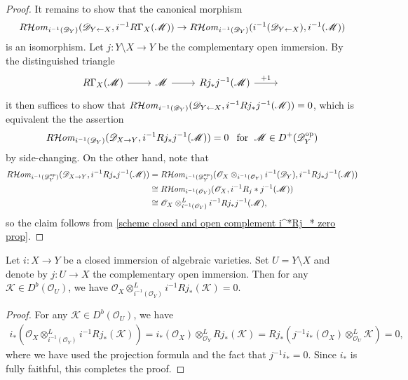\begin{proof}
It remains to show that the canonical morphism
\[R\!\operatorname{\mathcal{H}\hspace*{-0.4pt}\textit{om}\hspace{0.5pt}}_{i^{-1}(\mathscr{D}_Y)}(\mathscr{D}_{Y\leftarrow X},i^{-1}R\Gamma_X(\mathscr{M}))\to R\!\operatorname{\mathcal{H}\hspace*{-0.4pt}\textit{om}\hspace{0.5pt}}_{i^{-1}(\mathscr{D}_Y)}(i^{-1}(\mathscr{D}_{Y\leftarrow X}),i^{-1}(\mathscr{M}))\]
is an isomorphism. Let $j:Y\setminus X\to Y$ be the complementary open immersion. By the distinguished triangle
\[\begin{tikzcd}
R\Gamma_X(\mathscr{M})\ar[r]&\mathscr{M}\ar[r]&Rj_*j^{-1}(\mathscr{M})\ar[r,"+1"]&{}
\end{tikzcd}\]
it then suffices to show that $R\!\operatorname{\mathcal{H}\hspace*{-0.4pt}\textit{om}\hspace{0.5pt}}_{i^{-1}(\mathscr{D}_Y)}(\mathscr{D}_{Y\leftarrow X},i^{-1}Rj_*j^{-1}(\mathscr{M}))=0$, which is equivalent the the assertion
\[R\!\operatorname{\mathcal{H}\hspace*{-0.4pt}\textit{om}\hspace{0.5pt}}_{i^{-1}(\mathscr{D}_Y)}(\mathscr{D}_{X\to Y},i^{-1}Rj_*j^{-1}(\mathscr{M}))=0 \hspace{8pt}\text{for}\hspace{6pt} \mathscr{M}\in D^+(\mathscr{D}_Y^{\mathrm{op}})\]
by side-changing. On the other hand, note that
\begin{align*}
R\!\operatorname{\mathcal{H}\hspace*{-0.4pt}\textit{om}\hspace{0.5pt}}_{i^{-1}(\mathscr{D}_Y^{\mathrm{op}})}(\mathscr{D}_{X\to Y},i^{-1}Rj_*j^{-1}(\mathscr{M}))&=R\!\operatorname{\mathcal{H}\hspace*{-0.4pt}\textit{om}\hspace{0.5pt}}_{i^{-1}(\mathscr{D}_Y^{\mathrm{op}})}(\mathscr{O}_X\otimes_{i^{-1}(\mathscr{O}_Y)}i^{-1}(\mathscr{D}_Y),i^{-1}Rj_*j^{-1}(\mathscr{M}))\\
&\cong R\!\operatorname{\mathcal{H}\hspace*{-0.4pt}\textit{om}\hspace{0.5pt}}_{i^{-1}(\mathscr{O}_Y)}(\mathscr{O}_X,i^{-1}R_j*j^{-1}(\mathscr{M}))\\
&\cong \mathscr{O}_X\otimes_{i^{-1}(\mathscr{O}_Y)}^Li^{-1}Rj_*j^{-1}(\mathscr{M}),
\end{align*}
so the claim follows from \cref{scheme closed and open complement i^*Rj_* zero prop}.
\end{proof}

\begin{lemma}\label{scheme closed and open complement i^*Rj_* zero prop}
Let $i:X\to Y$ be a closed immersion of algebraic varieties. Set $U=Y\setminus X$ and denote by $j:U\to X$ the complementary open immersion. Then for any $\mathscr{K}\in D^b(\mathscr{O}_U)$, we have $\mathscr{O}_X\otimes_{i^{-1}(\mathscr{O}_Y)}^Li^{-1}Rj_*(\mathscr{K})=0$.
\end{lemma}
\begin{proof}
For any $\mathscr{K}\in D^b(\mathscr{O}_U)$, we have
\begin{align*}
i_*(\mathscr{O}_X\otimes_{i^{-1}(\mathscr{O}_Y)}^Li^{-1}Rj_*(\mathscr{K}))=i_*(\mathscr{O}_X)\otimes_{\mathscr{O}_Y}^LRj_*(\mathscr{K})=Rj_*(j^{-1}i_*(\mathscr{O}_X)\otimes_{\mathscr{O}_{U}}^L\mathscr{K})=0,
\end{align*}
where we have used the projection formula and the fact that $j^{-1}i_*=0$. Since $i_*$ is fully faithful, this completes the proof.
\end{proof}

